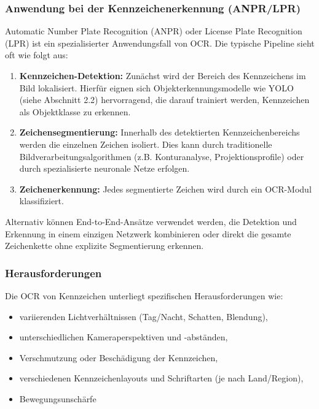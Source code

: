 \subsubsection{Anwendung bei der Kennzeichenerkennung (ANPR/LPR)}
Automatic Number Plate Recognition (ANPR) oder License Plate Recognition (LPR) ist ein spezialisierter Anwendungsfall von OCR. Die typische Pipeline sieht oft wie folgt aus:

\begin{enumerate}
    \item \textbf{Kennzeichen-Detektion:} Zunächst wird der Bereich des Kennzeichens im Bild lokalisiert. Hierfür eignen sich Objekterkennungsmodelle wie YOLO (siehe Abschnitt 2.2) hervorragend, die darauf trainiert werden, Kennzeichen als Objektklasse zu erkennen.

    \item \textbf{Zeichensegmentierung:} Innerhalb des detektierten Kennzeichenbereichs werden die einzelnen Zeichen isoliert. Dies kann durch traditionelle Bildverarbeitungsalgorithmen (z.B. Konturanalyse, Projektionsprofile) oder durch spezialisierte neuronale Netze erfolgen.

    \item \textbf{Zeichenerkennung:} Jedes segmentierte Zeichen wird durch ein OCR-Modul klassifiziert.
\end{enumerate}

Alternativ können End-to-End-Ansätze verwendet werden, die Detektion und Erkennung in einem einzigen Netzwerk kombinieren oder direkt die gesamte Zeichenkette ohne explizite Segmentierung erkennen.

\subsubsection{Herausforderungen}
Die OCR von Kennzeichen unterliegt spezifischen Herausforderungen wie:
\begin{itemize}
    \item variierenden Lichtverhältnissen (Tag/Nacht, Schatten, Blendung),
    \item unterschiedlichen Kameraperspektiven und -abständen,
    \item Verschmutzung oder Beschädigung der Kennzeichen,
    \item verschiedenen Kennzeichenlayouts und Schriftarten (je nach Land/Region),
    \item Bewegungsunschärfe
\end{itemize}

